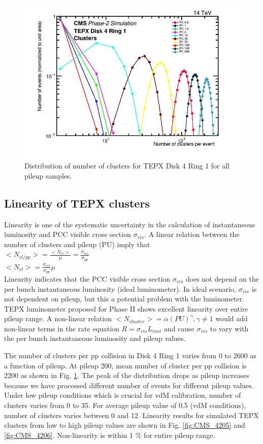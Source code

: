 \begin{figure}[H]
  \centering
  \includegraphics[width=0.7\columnwidth]{ashish_thesis/tepx_D4R!_clusters._allpu_1.png}
  \caption[D4R1 Clusters All Pileup]{Distribution of number of clusters for TEPX Disk 4 Ring 1 for all pileup samples.}
  \label{fig:tepx_cl_allPU}
\end{figure}

\newpage
\subsection{Linearity of TEPX clusters}

Linearity is one of the systematic uncertainty in the calculation of instantaneous luminosity and PCC visible cross section $\sigma_{vis}$. A linear relation between the number of clusters and pileup (PU) imply that \\

$<N_{cl/pp}> = \frac{<N_{cl}>}{\mu} = \frac{\sigma_{vis}}{\sigma_{pp}}$ \\

$<N_{cl}> =  \frac{\sigma_{vis}}{\sigma_{pp}} \mu $ \\

Linearity indicates that the PCC visible cross section $\sigma_{vis}$ does not depend on the per bunch instantaneous luminosity (ideal luminometer). In ideal scenario, $\sigma_{vis}$ is not dependent on pileup, but this a potential problem with the luminometer. TEPX luminometer proposed for Phase II shows excellent linearity over entire pileup range. A non-linear relation $<N_{cluster}> = \alpha (PU)^{\gamma}, \gamma \neq 1$ would add non-linear terms in the rate equation $R = \sigma_{vis} L_{inst}$  and cause $\sigma_{vis}$ to vary with the per bunch instantaneous luminosity and pileup values.

The number of clusters per pp collision in Disk 4 Ring 1 varies from 0 to 2600 as a function of pileup. At pileup 200, mean number of cluster per pp collision is 2200 as shown in Fig. \ref{fig:tepx_cl_allPU}. The peak of the distribution drops as pileup increases because we have processed different number of events for different pileup values. Under low pileup conditions which is crucial for vdM calibration, number of clusters varies from 0 to 35. For average pileup value of 0.5 (vdM conditions), number of clusters varies between 0 and 12. Linearity results for simulated TEPX clusters from low to high pileup values are shown in  Fig. \ref{fig:CMS_4205} and  \ref{fig:CMS_4206}. Non-linearity is within 1 \% for entire pileup range.

